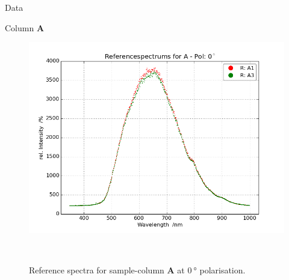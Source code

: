 \begin{appendix}
  \label{Appendix}
  
  
  
  \begin{chapter}{Data}
    \label{Appendix:Data}
    
    
    \newpage
    \begin{section}{Column \textbf{A}}
      \label{Appendix:DataA}
      
      \begin{figure}[ht!]
        \centering
        \begin{minipage}{.92\textwidth}
          \centering
          \includegraphics[width=\textwidth]{Figures/Refspec_APol0.png}
          \caption{Reference spectra for sample-column \textbf{A} at
              $\SI{0}{\degree}$ polarisation.}
          \label{fig:Refspec_APol0}
        \end{minipage}\\
        \begin{minipage}{.92\textwidth}
          \centering

\end{minipage}
\end{figure}
\end{section}
\end{chapter}
\end{appendix}
